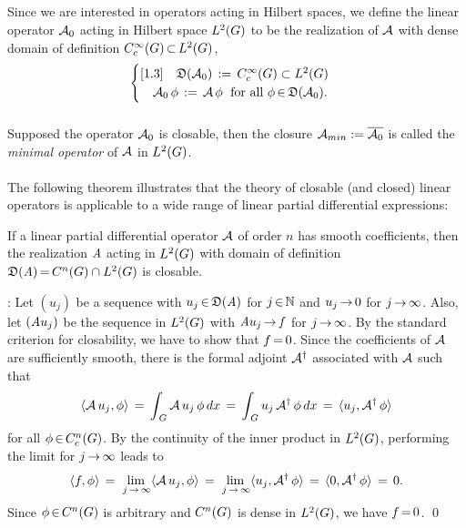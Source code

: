 \documentclass[11pt,twoside]{article}
\begin{document}
\subparagraph*{}
Since we are interested in operators acting in Hilbert spaces,
we define the linear operator ${\mathcal{A}}_0$ acting in Hilbert space $L^2(G)$ 
to be the realization of ${\mathcal{A}}$ with dense domain of definition
$C_c^{\infty}(G) {\,\subset\,} L^2(G)$, {\ie}
\[
\begin{cases}[1.3]
\quad \mathfrak{D}({\mathcal{A}}_0) \,:=\, C_c^{\infty}(G) \subset L^2(G) \\
\quad {\mathcal{A}}_0 \, \phi  \,:=\, {\mathcal{A}} \, \phi
\; \mbox{ for all } \phi {\,\in\,} \mathfrak{D}({\mathcal{A}}_0).\\
\end{cases}
\]

\subparagraph*{}
Supposed the operator ${\mathcal{A}}_0$ is closable,
then the closure ${\mathcal{A}}_{min} := {\overline{{\mathcal{A}}_0 }}$
is called the \textit{minimal operator} of ${\mathcal{A}}$ in $L^2(G)$.

\paragraph*{}
The following theorem illustrates
that the theory of closable (and closed) linear operators
is applicable to a wide range of linear partial differential expressions:

\begin{theorem}\label{SMOOTH_DIFFERENTIAL_OPERATORS_ARE_CLOSABLE}
If a linear partial differential operator ${\mathcal{A}}$ of order $n$
has smooth coefficients,
then the realization $\mathit{A}$ acting in $L^2(G)$
with domain of definition
$\mathfrak{D}(\mathit{A}) {\,=\,} C^n(G) \cap L^2(G)$ is closable.
\end{theorem}

\Proof:
Let $(u_j)$ be a sequence with $u_j {\,\in\,} \mathfrak{D}(\mathit{A})$ for $j {\,\in\,} {\mathbb{N}}$
and $u_j {\,\to\,} 0$ for $j {\,\to\,} \infty$.
Also,
let $(\mathit{A} u_j)$ be the sequence in $L^2(G)$
with $\mathit{A} u_j {\,\to\,} f$ for $j {\,\to\,} \infty$.
By the standard criterion for closability,
we have to show that $f {\,=\,} 0$.
Since the coefficients of ${\mathcal{A}}$ are sufficiently smooth,
there is the formal adjoint ${\mathcal{A}}^{\dag}$ associated with ${\mathcal{A}}$ such that
\[
\langle {\mathcal{A}}\,u_j,\phi \rangle \,=\,
\int_{\,G} {\mathcal{A}}\,u_j \,\phi\,dx \,=\,
\int_{\,G} u_j\,{\mathcal{A}}^{\dag}\,\phi\,dx \,=\,
\langle u_j,{\mathcal{A}}^{\dag}\,\phi \rangle
\]
for all $\phi {\,\in\,} C_c^{n}(G)$.
By the continuity of the inner product in $L^2(G)$,
performing the limit for $j {\,\to\,} \infty$ leads to
\[
                      \langle f,\phi \rangle \,=\,
\lim_{\,j {\,\to\,} \infty} \langle {\mathcal{A}}\,u_j,\phi \rangle \,=\,
\lim_{\,j {\,\to\,} \infty} \langle u_j,{\mathcal{A}}^{\dag}\,\phi \rangle \,=\,
                      \langle 0,{\mathcal{A}}^{\dag}\,\phi \rangle \,=\, 0.
\]
Since $\phi {\,\in\,} C^{n}(G)$ is arbitrary and $C^{n}(G)$ is dense in $L^2(G)$,
we have $f {\,=\,} 0$.
\qed
\end{document}
